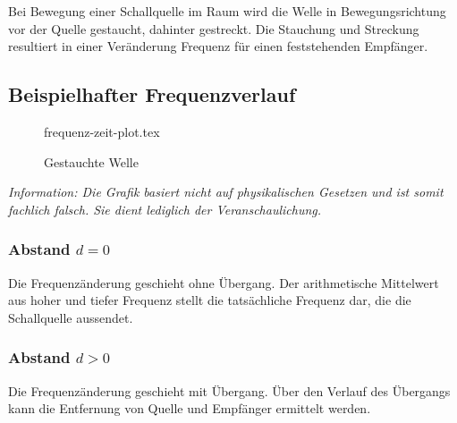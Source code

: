 \documentclass[12pt, a4paper]{article}
\begin{document}
Bei Bewegung einer Schallquelle im Raum wird die Welle in Bewegungsrichtung vor
der Quelle gestaucht, dahinter gestreckt. Die Stauchung und Streckung resultiert
in einer Veränderung Frequenz für einen feststehenden Empfänger.

\subsection{Beispielhafter Frequenzverlauf}

\begin{minipage}{0.5\textwidth}
    \begin{figure}[H]
        {frequenz-zeit-plot.tex}
        \caption{Gestauchte Welle}
    \end{figure}
\end{minipage} \hfill
\begin{minipage}{0.45\textwidth}
    \begin{footnotesize}
        \emph{Information: Die Grafik basiert nicht auf physikalischen Gesetzen und ist somit fachlich falsch. Sie dient lediglich der Veranschaulichung.}
    \end{footnotesize}
\end{minipage}
\vspace{1cm}

\subsubsection*{Abstand \(d = 0\)}
Die Frequenzänderung geschieht ohne Übergang. Der arithmetische Mittelwert aus
hoher und tiefer Frequenz stellt die tatsächliche Frequenz dar, die die
Schallquelle aussendet.

\subsubsection*{Abstand \(d > 0\)}
Die Frequenzänderung geschieht mit Übergang. Über den Verlauf des Übergangs kann die Entfernung von Quelle und Empfänger ermittelt werden.
\end{document}
